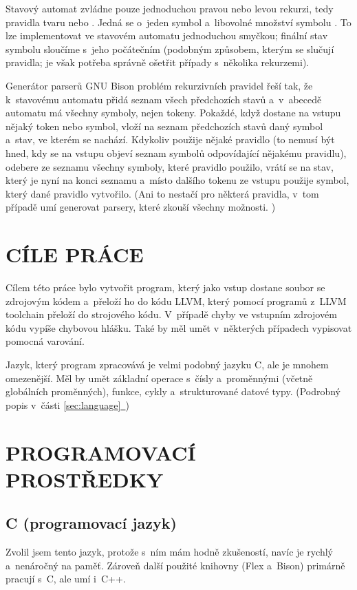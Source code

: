 \documentclass[12pt]{article}
\newcommand{\fullref}[1]{\hyperref[#1]{\ref*{#1}\ \nameref*{#1}}}
\def\code#1{\texttt{#1}}
\begin{document}
Stavový automat zvládne pouze jednoduchou pravou nebo levou rekurzi, tedy pravidla tvaru \uv{\code{x: y | a x}} nebo \uv{\code{x: y | x a}}.
Jedná se o~jeden symbol  a~libovolné množství symbolu .
To lze implementovat ve stavovém automatu jednoduchou smyčkou; finální stav symbolu  sloučíme s~jeho počátečním
(podobným způsobem, kterým se slučují pravidla; je však potřeba správně ošetřit případy s~několika rekurzemi).

Generátor parserů GNU Bison problém rekurzivních pravidel řeší tak, že k~stavovému automatu přidá seznam všech předchozích stavů a~v~abecedě automatu má všechny symboly, nejen tokeny.
Pokaždé, když dostane na vstupu nějaký token nebo symbol, vloží na seznam předchozích stavů daný symbol a~stav, ve kterém se nachází.
Kdykoliv použije nějaké pravidlo (to nemusí být hned, kdy se na vstupu objeví seznam symbolů odpovídající nějakému pravidlu), odebere ze seznamu všechny symboly, které pravidlo použilo,
vrátí se na stav, který je nyní na konci seznamu a~místo dalšího tokenu ze vstupu použije symbol, který dané pravidlo vytvořilo.
(Ani to nestačí pro některá pravidla, v~tom případě umí generovat parsery, které zkouší všechny možnosti. \cite{bison:docs})





\section{CÍLE PRÁCE}
Cílem této práce bylo vytvořit program, který jako vstup dostane soubor se zdrojovým kódem a~přeloží ho do kódu LLVM, který pomocí programů z~LLVM toolchain přeloží do strojového kódu.
V~případě chyby ve vstupním zdrojovém kódu vypíše chybovou hlášku. Také by měl umět v~některých případech vypisovat pomocná varování.

Jazyk, který program zpracovává je velmi podobný jazyku C, ale je mnohem omezenější.
Měl by umět základní operace s~čísly a~proměnnými (včetně globálních proměnných), funkce, cykly a~strukturované datové typy. (Podrobný popis v~části \fullref{sec:language})


\section{PROGRAMOVACÍ PROSTŘEDKY}
\subsection{C (programovací jazyk)}
Zvolil jsem tento jazyk, protože s~ním mám hodně zkušeností, navíc je rychlý a~nenáročný na paměť.
Zároveň další použité knihovny (Flex a~Bison) primárně pracují s~C, ale umí i~C++. \cite{flex:docs,bison:docs}
\end{document}
